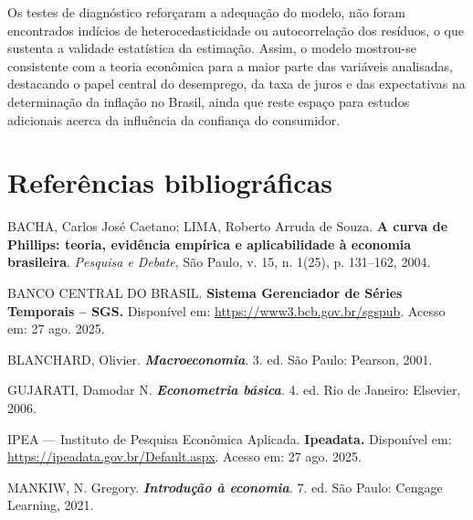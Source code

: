 \documentclass[12pt,oneside]{abntex2}
\begin{document}
Os testes de diagnóstico reforçaram a adequação do modelo, não foram encontrados indícios de heterocedasticidade ou autocorrelação dos resíduos, o que sustenta a validade estatística da estimação. Assim, o modelo mostrou-se consistente com a teoria econômica para a maior parte das variáveis analisadas, destacando o papel central do desemprego, da taxa de juros e das expectativas na determinação da inflação no Brasil, ainda que reste espaço para estudos adicionais acerca da influência da confiança do consumidor.


\section{\textbf{Referências bibliográficas}}
\setlength{\parindent}{0pt} %
\setlength{\itemindent}{0pt} %
\setlength{\leftskip}{0pt}   %



BACHA, Carlos José Caetano; LIMA, Roberto Arruda de Souza. \textbf{A curva de Phillips: teoria, evidência empírica e aplicabilidade à economia brasileira}. \textit{Pesquisa e Debate}, São Paulo, v. 15, n. 1(25), p. 131–162, 2004.



BANCO CENTRAL DO BRASIL. \textbf{Sistema Gerenciador de Séries Temporais – SGS.} Disponível em: \url{https://www3.bcb.gov.br/sgspub}. Acesso em: 27 ago. 2025.



BLANCHARD, Olivier. \textbf{\textit{Macroeconomia}}. 3. ed. São Paulo: Pearson, 2001.



GUJARATI, Damodar N. \textbf{\textit{Econometria básica}}. 4. ed. Rio de Janeiro: Elsevier, 2006.



IPEA — Instituto de Pesquisa Econômica Aplicada. \textbf{Ipeadata.} Disponível em: \url{https://ipeadata.gov.br/Default.aspx}. Acesso em: 27 ago. 2025.



MANKIW, N. Gregory. \textbf{\textit{Introdução à economia}}. 7. ed. São Paulo: Cengage Learning, 2021.
\end{document}
